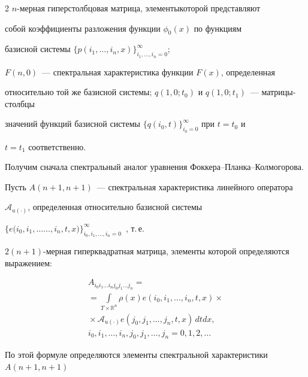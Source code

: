 \begin{multicols}{2}
$n$-мер\-ная гиперстолбцовая мат\-ри\-ца, элементы\linebreak которой представляют 


собой коэффициенты разложения функции $\phi_0(x)$ по функциям 


базисной сис\-те\-мы $\{p(i_1,\dots,i_n,x)\}_{i_1,\dots,i_n = 0}^\infty$; 


${F(n,0)}$~--- спектральная характеристика функции $F(x)$, определенная 


относительно той же базисной системы; ${q(1,0;t_0)}$ и ${q(1,0;t_1)}$~--- мат\-ри\-цы-столб\-цы 


значений функций базисной сис\-те\-мы $\{q(i_0,t)\}_{i_0 = 0}^\infty$ при ${t = t_0}$ и 


${t = t_1}$ соответственно.





Получим сначала спектральный аналог уравнения Фок\-ке\-ра--План\-ка--Кол\-мо\-го\-ро\-ва. 


Пусть ${A(n+1,n+1)}$~--- спектральная характеристика линейного оператора 


$\mathcal{A}_{u(\cdot)}$, определенная относительно базисной сис\-те\-мы 


$\{e(i_0,i_1,\dots$\linebreak $\dots,i_n,t,x)\}_{i_0,i_1,\dots,i_n = 0}^\infty$~\cite{PanRybSot, PanRyb}, т.\,е.\


${2(n+1)}$-мерная гиперквадратная мат\-ри\-ца, элементы которой определяются выражением:


\begin{multline}


\label{eqSpOper}


A_{i_0 i_1 \dots i_n j_0 j_1 \dots j_n} ={}\\


{}= \int\limits_{T \times \mathbb{R}^n} \rho(x) e(i_0,i_1,\dots,i_n,t,x)\times{}\\


{}\times \mathcal{A}_{u(\cdot)} e(j_0,j_1,\dots,j_n,t,x)\, dt dx, \\


  i_0,i_1,\dots,i_n,j_0,j_1,\dots,j_n = 0,1,2,\dots


\end{multline}





По этой формуле определяются элементы спектральной характеристики ${A(n+1,n+1)}$ 



\end{multicols}
